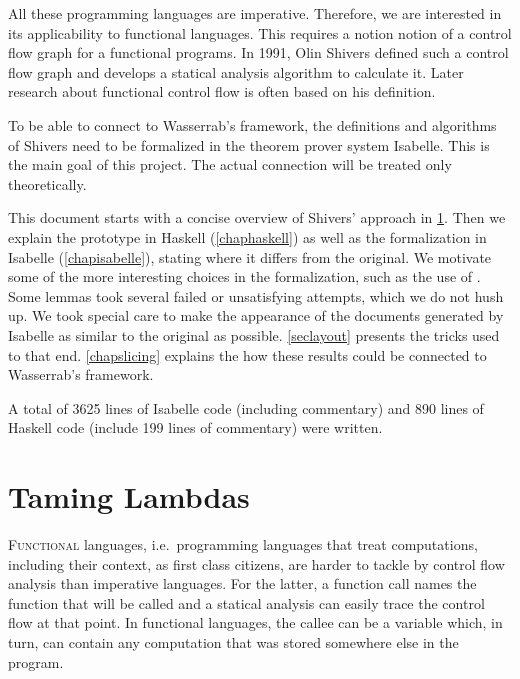 \documentclass[a4paper,halfparskip,DIV=10,11pt]{scrbook}
\begin{document}
All these programming languages are imperative. Therefore, we are interested in its applicability to functional languages. This requires a notion notion of a control flow graph for a functional programs. In 1991, Olin Shivers defined such a control flow graph and develops a statical analysis algorithm to calculate it. Later research about functional control flow is often based on his definition.

To be able to connect to Wasserrab’s framework, the definitions and algorithms of Shivers need to be formalized in the theorem prover system Isabelle. This is the main goal of this project. The actual connection will be treated only theoretically.

This document starts with a concise overview of Shivers’ approach in \cref{chapshivers}. Then we explain the prototype in Haskell (\cref{chaphaskell}) as well as the formalization in Isabelle (\cref{chapisabelle}), stating where it differs from the original. We motivate some of the more interesting choices in the formalization, such as the use of . Some lemmas took several failed or unsatisfying attempts, which we do not hush up. We took special care to make the appearance of the documents generated by Isabelle as similar to the original as possible. \cref{seclayout} presents the tricks used to that end. \cref{chapslicing} explains the how these results could be connected to Wasserrab’s framework.

A total of 3625 lines of Isabelle code (including commentary) and 890 lines of Haskell code (include 199 lines of commentary) were written.


% 

\chapter{Taming Lambdas}
\label{chapshivers}

\lettrine F{unctional} languages, i.e.\ programming languages that treat computations, including their context, as first class citizens, are harder to tackle by control flow analysis than imperative languages. For the latter, a function call names the function that will be called and a statical analysis can easily trace the control flow at that point. In functional languages, the callee can be a variable which, in turn, can contain any computation that was stored somewhere else in the program.
\end{document}
